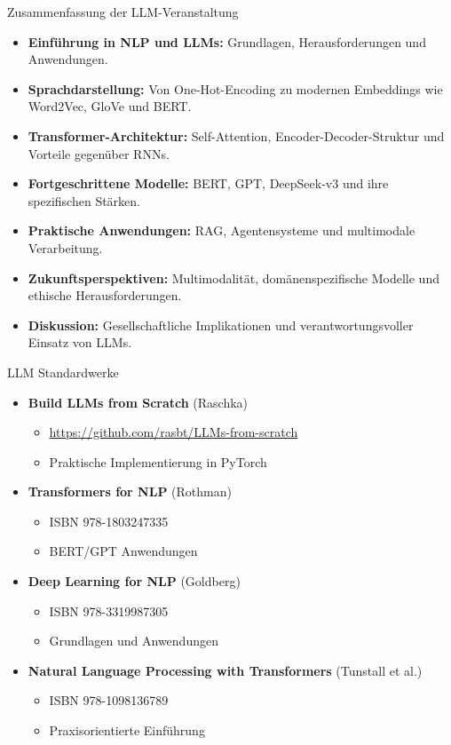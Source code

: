 \documentclass[aspectratio=1610, xcolor=dvipsnames, 9pt]{beamer}
\begin{document}
\begin{frame}{Zusammenfassung der LLM-Veranstaltung}
  \begin{itemize}
    \item \textbf{Einführung in NLP und LLMs:} Grundlagen, Herausforderungen und Anwendungen. \\
    \item \textbf{Sprachdarstellung:} Von One-Hot-Encoding zu modernen Embeddings wie Word2Vec, GloVe und BERT. \\
    \item \textbf{Transformer-Architektur:} Self-Attention, Encoder-Decoder-Struktur und Vorteile gegenüber RNNs. \\
    \item \textbf{Fortgeschrittene Modelle:} BERT, GPT, DeepSeek-v3 und ihre spezifischen Stärken. \\
    \item \textbf{Praktische Anwendungen:} RAG, Agentensysteme und multimodale Verarbeitung. \\
    \item \textbf{Zukunftsperspektiven:} Multimodalität, domänenspezifische Modelle und ethische Herausforderungen. \\
    \item \textbf{Diskussion:} Gesellschaftliche Implikationen und verantwortungsvoller Einsatz von LLMs.
  \end{itemize}
\end{frame}

\begin{frame}{LLM Standardwerke}
\begin{itemize}
\item \textbf{Build LLMs from Scratch} (Raschka)
\begin{itemize}
\item \url{https://github.com/rasbt/LLMs-from-scratch}
\item Praktische Implementierung in PyTorch
\end{itemize}

\item \textbf{Transformers for NLP} (Rothman)
\begin{itemize}
\item ISBN 978-1803247335
\item BERT/GPT Anwendungen
\end{itemize}

\item \textbf{Deep Learning for NLP} (Goldberg)
\begin{itemize}
\item ISBN 978-3319987305
\item Grundlagen und Anwendungen
\end{itemize}

\item \textbf{Natural Language Processing with Transformers} (Tunstall et al.)
\begin{itemize}
\item ISBN 978-1098136789
\item Praxisorientierte Einführung
\end{itemize}
\end{itemize}
\end{frame}
\end{document}
